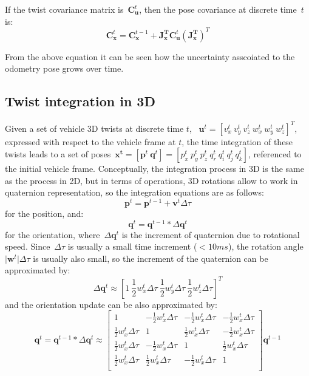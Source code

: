 If the twist covariance matrix is~$\mathbf{C}^t_{\mathbf{u}}$, then the pose covariance at discrete time~$t$ is: 
\begin{equation}
 \mathbf{C}^t_{\mathbf{x}} = \mathbf{C}^{t-1}_{\mathbf{x}} +  
    \mathbf{J}^{\mathbf{T}}_{\mathbf{x}}
    \mathbf{C}^t_{\mathbf{u}}
    (\mathbf{J}^{\mathbf{T}}_{\mathbf{x}})^T
\end{equation}

From the above equation it can be seen how the uncertainty asscoiated to the odometry pose grows over time. 


\subsection{Twist integration in 3D}
Given a set of vehicle 3D twists at discrete time $t$, ~$\mathbf{u}^t=[v^t_x\ v^t_y\ v^t_z\ w^t_x \ w^t_y \ w^t_z]^T$, expressed with respect to the vehicle frame at $t$, the time integration of these twists leads to a set of poses~$\mathbf{x^t}=[\mathbf{p}^t\ \mathbf{q}^t ]=[p^t_x\ p^t_y\ p^t_z\ q^t_r\ q^t_i\ q^t_j\ q^t_k]$, referenced to the initial vehicle frame. Conceptually, the integration process in 3D is the same as the process in 2D, but in terms of operations, 3D rotations allow to work in quaternion representation, so the integration equations are as follows: 
\begin{equation}
\mathbf{p}^t = \mathbf{p}^{t-1} + \mathbf{v}^t\Delta\tau
\end{equation}
for the position, and: 
\begin{equation}
\mathbf{q}^t = \mathbf{q}^{t-1}*\Delta\mathbf{q}^t
\end{equation}
for the orientation, where~$\Delta\mathbf{q}^t$ is the increment of quaternion due to rotational speed. Since~$\Delta\tau$ is usually a small time increment ($<10ms$), the rotation angle $\vert\mathbf{w}^t \vert \Delta\tau$ is usually also small, so  the increment of the quaternion can be approximated by: 
\begin{equation}
 \Delta\mathbf{q}^t \approx [1\ \frac{1}{2}w^t_x\Delta\tau\ \frac{1}{2}w^t_y\Delta\tau\ \frac{1}{2}w^t_z\Delta\tau ]^T
\end{equation}
and the orientation update can be also approximated by: 
\begin{equation}
\mathbf{q}^t = \mathbf{q}^{t-1}*\Delta\mathbf{q}^t
\approx 
\left[
 \begin{array}{cccc}
  1 & -\frac{1}{2}w^t_x\Delta\tau & -\frac{1}{2}w^t_x\Delta\tau & -\frac{1}{2}w^t_x\Delta\tau\\
  \frac{1}{2}w^t_x\Delta\tau & 1 & \frac{1}{2}w^t_x\Delta\tau & -\frac{1}{2}w^t_x\Delta\tau\\
  \frac{1}{2}w^t_x\Delta\tau & -\frac{1}{2}w^t_x\Delta\tau & 1 & \frac{1}{2}w^t_x\Delta\tau\\
  \frac{1}{2}w^t_x\Delta\tau & \frac{1}{2}w^t_x\Delta\tau & -\frac{1}{2}w^t_x\Delta\tau & 1\\
 \end{array}
 \right]
 \mathbf{q}^{t-1}
\end{equation}


